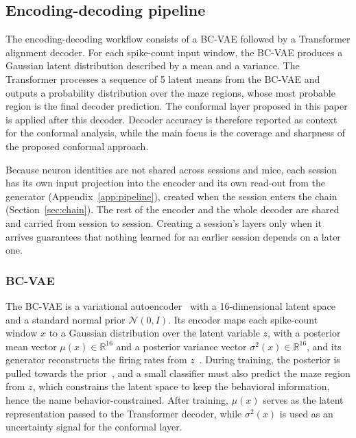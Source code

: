 \documentclass{article}
\begin{document}
\subsection{Encoding-decoding pipeline}
The encoding-decoding workflow consists of a BC-VAE followed by a Transformer alignment decoder. For each spike-count input window, the BC-VAE produces a Gaussian latent distribution described by a mean and a variance. The Transformer processes a sequence of 5 latent means from the BC-VAE and outputs a probability distribution over the maze regions, whose most probable region is the final decoder prediction. The conformal layer proposed in this paper is applied after this decoder. Decoder accuracy is therefore reported as context for the conformal analysis, while the main focus is the coverage and sharpness of the proposed conformal approach.

Because neuron identities are not shared across sessions and mice, each session has its own input projection into the encoder and its own read-out from the generator (Appendix~\ref{app:pipeline}), created when the session enters the chain (Section~\ref{sec:chain}). The rest of the encoder and the whole decoder are shared and carried from session to session. Creating a session's layers only when it arrives guarantees that nothing learned for an earlier session depends on a later one.

\subsubsection{BC-VAE}
The BC-VAE is a variational autoencoder~\cite{kingma2022a} with a 16-dimensional latent space and a standard normal prior $\mathcal{N}(0,I)$. Its encoder maps each spike-count window $x$ to a Gaussian distribution over the latent variable $z$, with a posterior mean vector $\mu(x)\in\mathbb{R}^{16}$ and a posterior variance vector $\sigma^2(x)\in\mathbb{R}^{16}$, and its generator reconstructs the firing rates from $z$~\cite{pandarinath2018a}. During training, the posterior is pulled towards the prior~\cite{higgins2017a}, and a small classifier must also predict the maze region from $z$, which constrains the latent space to keep the behavioral information, hence the name behavior-constrained. After training, $\mu(x)$ serves as the latent representation passed to the Transformer decoder, while $\sigma^2(x)$ is used as an uncertainty signal for the conformal layer.
\end{document}

